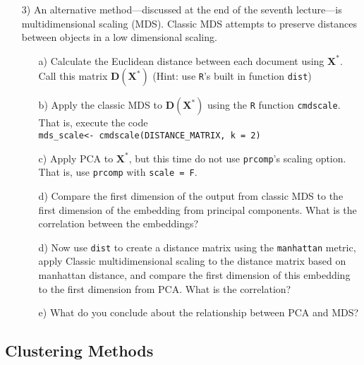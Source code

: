 \documentclass[12pt,letterpaper]{article}
\begin{document}
\begin{itemize}
\item[3)]An alternative method---discussed at the end of the seventh lecture---is multidimensional scaling (MDS).  Classic MDS attempts to preserve distances between objects in a low dimensional scaling.  

\begin{itemize}
\item[a)] Calculate the Euclidean distance between each document using $\boldsymbol{X}^{*}$.  Call this matrix $\boldsymbol{D}(\boldsymbol{X}^{*})$  (Hint: use {\tt R}'s built in function {\tt dist})
\item[b)] Apply the classic MDS to $\boldsymbol{D}(\boldsymbol{X}^{*})$ using the {\tt R} function {\tt cmdscale}.  That is, execute the code\\
{\tt mds\_scale<- cmdscale(DISTANCE\_MATRIX, k = 2)} 
\item[c)] Apply PCA to $\boldsymbol{X}^{*}$, but this time do not use {\tt prcomp}'s scaling option.  That is, use {\tt prcomp} with {\tt scale = F}.  
\item[d)] Compare the first dimension of the output from classic MDS to the first dimension of the embedding from principal components. What is the correlation between the embeddings? 
\item[d)] Now use {\tt dist} to create a distance matrix using the {\tt manhattan} metric, apply Classic multidimensional scaling to the distance matrix based on manhattan distance, and compare the first dimension of this embedding to the first dimension from PCA.  What is the correlation?
\item[e)] What do you conclude about the relationship between PCA and MDS?
\end{itemize}

\end{itemize}

\subsection*{Clustering Methods}
\end{document}
